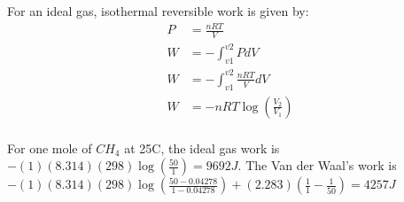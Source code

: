\documentclass[10pt]{article} %
\begin{document}
For an ideal gas, isothermal reversible work is given by:\\

\begin{align}
  P &= \frac{nRT}{V}\\
  W &= -\int_{v1}^{v2} PdV\\
  W &= -\int_{v1}^{v2} \frac{nRT}{V}dV\\
  W &= -nRT\log(\frac{V_2}{V_1})\\  
\end{align}

For one mole of $CH_4$ at 25C, the ideal gas work is $-(1)(8.314)(298)\log(\frac{50}{1}) = 9692J$. The Van der Waal's work is $-(1)(8.314)(298)\log(\frac{50-0.04278}{1-0.04278}) + (2.283)(\frac{1}{1} - \frac{1}{50}) = 4257J$
\end{document}
